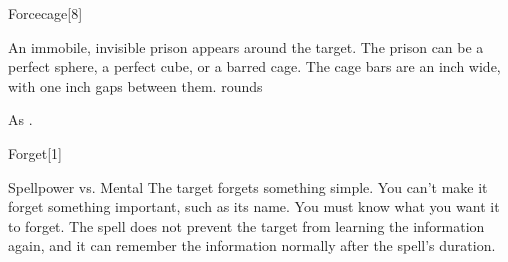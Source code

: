 \begin{spellsection}{Forcecage}[8]
    \begin{spellheader}
    \end{spellheader}
    \begin{spellcontent}
        \begin{spelltargetinginfo}
        \end{spelltargetinginfo}
        \begin{spelleffects}
            \spelleffect An immobile, invisible prison appears around the target. The prison can be a perfect sphere, a perfect cube, or a barred cage. The cage bars are an inch wide, with one inch gaps between them.
             rounds
        \end{spelleffects}
    \end{spellcontent}
    \begin{spellfooter}
        \spellnotes As .
        \miscastrandom
    \end{spellfooter}
\end{spellsection}

\begin{spellsection}{Forget}[1]
    \begin{spellheader}
    \end{spellheader}
    \begin{spellcontent}
        \begin{spelltargetinginfo}
        \end{spelltargetinginfo}
        \begin{spelleffects}
            \begin{spellattack}{Spellpower vs. Mental}
                \spelleffect The target forgets something simple. You can't make it forget something important, such as its name. You must know what you want it to forget. The spell does not prevent the target from learning the information again, and it can remember the information normally after the spell's duration.
            \end{spellattack}
            \spelldur \durlong
        \end{spelleffects}
    \end{spellcontent}
    \begin{spellfooter}
        \miscastrandom
    \end{spellfooter}
    \begin{spellaugments}
    \end{spellaugments}
\end{spellsection}


